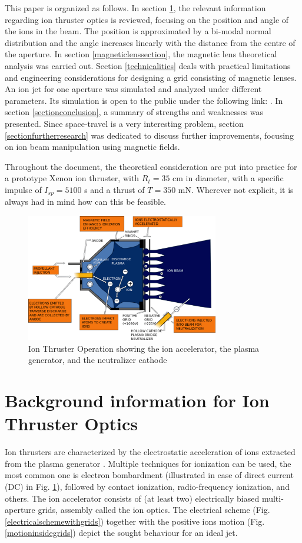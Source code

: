 \documentclass[twocolumn,12pt]{article}
\numberwithin{equation}{section} %
\numberwithin{equation}{section}
\begin{document}
This paper is organized as follows. In section \ref{backgroundinformation}, the relevant information regarding ion thruster optics is reviewed, focusing on the position and angle of the ions in the beam. The position is approximated by a bi-modal normal distribution and the angle increases linearly with the distance from the centre of the aperture. In section \ref{magneticlenssection}, the magnetic lens theoretical analysis was carried out. Section \ref{technicalities} deals with practical limitations and engineering considerations for designing a grid consisting of magnetic lenses. An ion jet for one aperture was simulated and analyzed under different parameters. Its simulation is open to the public under the following link: . In section \ref{sectionconclusion}, a summary of strengths and weaknesses was presented. Since space-travel is a very interesting problem, section \ref{sectionfurtherresearch} was dedicated to discuss further improvements, focusing on ion beam manipulation using magnetic fields. 

Throughout the document, the theoretical consideration are put into practice for a prototype Xenon ion thruster, with $R_t=35$ cm in diameter, with a specific impulse of $ I_{sp} = 5 100$ s and a thrust of $T = 350$ mN. Wherever not explicit, it is always had in mind how can this be feasible.

\begin{figure}
    \centering
    \includegraphics[width=0.75\textwidth]{figs/ionthruster.png}
    \caption{Ion Thruster Operation \cite{nasa} showing the ion accelerator, the plasma generator, and the neutralizer cathode}
    \label{ionthruster}
\end{figure}

\section{Background information for Ion Thruster Optics}
\label{backgroundinformation}
Ion thrusters are characterized by the electrostatic acceleration of ions extracted from the plasma generator \cite{kaufman}. Multiple techniques for ionization can be used, the most common one is electron bombardment (illustrated in case of direct current (DC)  in Fig. \ref{ionthruster}), followed by contact ionization, radio-frequency ionization, and others. The ion accelerator consists of (at least two) electrically biased multi-aperture grids, assembly called the ion optics. The electrical scheme (Fig. \ref{electricalschemewithgrids}) together with the positive ions motion (Fig. \ref{motioninsidegrids}) depict the sought behaviour for an ideal jet. 
\end{document}
